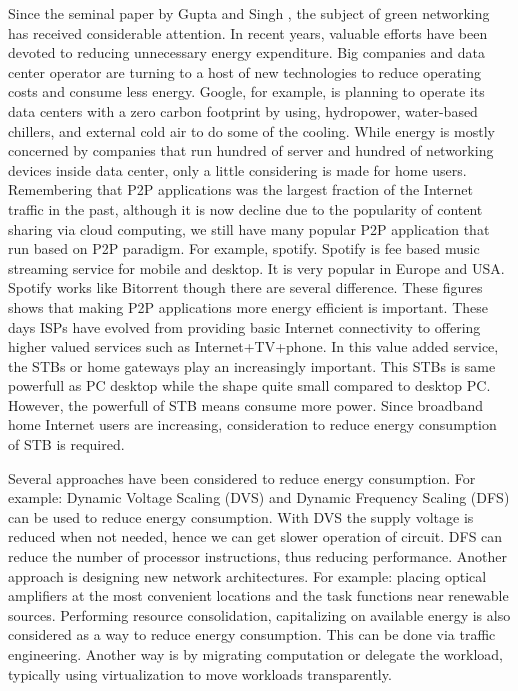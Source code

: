 Since the seminal paper by Gupta and Singh \cite{Gupta:2003:GI:863955.863959}, the subject of green networking has received considerable attention. 
In recent years, valuable efforts have been devoted to reducing unnecessary energy expenditure.
Big companies and data center operator are turning to a host of new technologies to reduce operating costs and consume less energy.
Google, for example, is planning to operate its data centers with a zero carbon footprint by using, hydropower, water-based chillers, and external cold air to do some of the cooling.
While energy is mostly concerned by companies that run hundred of server and hundred of networking devices inside data center, only a little considering is made for home users. 
Remembering that P2P applications was the largest fraction of the Internet traffic in the past, although it is now decline due to the popularity of content sharing via cloud computing, we still have many popular P2P application that run based on P2P paradigm.  
For example, spotify.
Spotify is fee based music streaming service for mobile and desktop. 
It is very popular in Europe and USA. 
Spotify works like Bitorrent though there are several difference.
These figures shows that making P2P applications more energy efficient is important.
These days ISPs have evolved from providing basic Internet connectivity to offering higher valued services such as Internet+TV+phone.
In this value added service, the STBs or home gateways play an increasingly important. 
This STBs is same powerfull as PC desktop while the shape quite small compared to desktop PC. 
However, the powerfull of STB means consume more power. 
Since broadband home Internet users are increasing, consideration to reduce energy consumption of STB is required. 

Several approaches have been considered to reduce energy consumption. 
For example: Dynamic Voltage Scaling (DVS) and Dynamic Frequency Scaling (DFS) can be used to reduce energy consumption.
With DVS the supply voltage is reduced when not needed, hence we can get slower operation of circuit.
DFS can reduce the number of processor instructions, thus reducing performance.
Another approach is designing new network architectures.
For example: placing optical amplifiers at the most convenient locations and the task functions near renewable sources.
Performing resource consolidation, capitalizing on available energy is also considered as a way to reduce energy consumption.
This can be done via traffic engineering. 
Another way is by migrating computation or delegate the workload, typically using virtualization to move workloads transparently.

